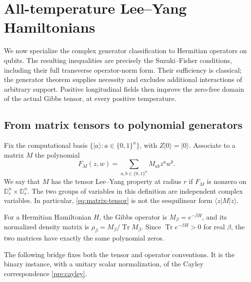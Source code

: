 \documentclass[reqno]{amsart}
\theoremstyle{definition}
\theoremstyle{remark}
\newcommand{\D}{\mathbb D}
\DeclareMathOperator{\Tr}{Tr}
\begin{document}

\section{All-temperature Lee--Yang Hamiltonians}\label{eq:section}

We now specialize the complex generator classification to Hermitian
operators on qubits.  The resulting inequalities are precisely the
Suzuki--Fisher conditions, including their full transverse operator-norm
form.  Their sufficiency is classical; the generator theorem supplies
necessity and excludes additional interactions of arbitrary support.
Positive longitudinal fields then improve the zero-free domain of the
actual Gibbs tensor, at every positive temperature.

\subsection{From matrix tensors to polynomial generators}

Fix the computational basis \(\{|a\rangle:a\in\{0,1\}^n\}\),
with \(Z|0\rangle=|0\rangle\).  Associate to a matrix \(M\) the
polynomial
\begin{equation}\label{eq:matrix-tensor}
 F_M(z,w)=\sum_{a,b\in\{0,1\}^n}M_{ab}z^aw^b.
\end{equation}
We say that \(M\) has the tensor Lee--Yang property at radius \(r\)
if \(F_M\) is nonzero on \(\D_r^n\times\D_r^n\).  The two
groups of variables in this definition are independent complex variables.
In particular, \eqref{eq:matrix-tensor} is not the sesquilinear form
\(\langle z|M|z\rangle\).

For a Hermitian Hamiltonian \(H\), the Gibbs operator is
\(M_\beta=e^{-\beta H}\), and its normalized density matrix is
\(\rho_\beta=M_\beta/\Tr M_\beta\).  Since
\(\Tr e^{-\beta H}>0\) for real \(\beta\), the two matrices have
exactly the same polynomial zeros.

The following bridge fixes both the tensor and operator conventions.
It is the binary instance, with a unitary scalar normalization, of the
Cayley correspondence \eqref{pre:cayley}.
\end{document}
